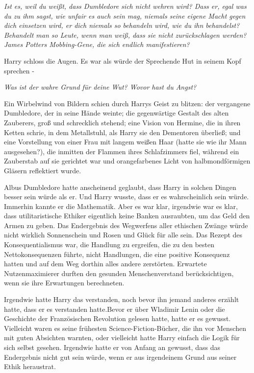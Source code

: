 \emph{Ist es, weil du weißt, dass Dumbledore sich nicht wehren wird? Dass er,
egal was du zu ihm sagst, wie unfair es auch sein mag, niemals seine eigene
Macht gegen dich einsetzen wird, er dich niemals so behandeln wird, wie du ihn
behandelst? Behandelt man so Leute, wenn man weiß, dass sie nicht zurückschlagen
werden? James Potters Mobbing-Gene, die sich endlich manifestieren?}

Harry schloss die Augen. Es war als würde der Sprechende Hut in seinem Kopf
sprechen -

\emph{Was ist der wahre Grund für deine Wut? Wovor hast du Angst?}

Ein Wirbelwind von Bildern schien durch Harrys Geist zu blitzen: der vergangene
Dumbledore, der in seine Hände weinte; die gegenwärtige Gestalt des alten
Zauberers, groß und schrecklich stehend; eine Vision von Hermine, die in ihren
Ketten schrie, in dem Metallstuhl, als Harry sie den Dementoren überließ; und
eine Vorstellung von einer Frau mit langem weißen Haar (hatte sie wie ihr Mann
ausgesehen?), die inmitten der Flammen ihres Schlafzimmers fiel, während ein
Zauberstab auf sie gerichtet war und orangefarbenes Licht von halbmondförmigen
Gläsern reflektiert wurde.

Albus Dumbledore hatte anscheinend geglaubt, dass Harry in solchen Dingen besser
sein würde als er. Und Harry wusste, dass er es wahrscheinlich sein würde.
Immerhin kannte er die Mathematik. Aber es war klar, irgendwie war es klar, dass
utilitaristische Ethiker eigentlich keine Banken ausraubten, um das Geld den
Armen zu geben. Das Endergebnis des Wegwerfens aller ethischen Zwänge würde
nicht wirklich Sonnenschein und Rosen und Glück für alle sein. Das Rezept des
Konsequentialismus war, die Handlung zu ergreifen, die zu den besten
Nettokonsequenzen führte, nicht Handlungen, die eine positive Konsequenz hatten
und auf dem Weg dorthin alles andere zerstörten. Erwartete Nutzenmaximierer
durften den gesunden Menschenverstand berücksichtigen, wenn sie ihre Erwartungen
berechneten.

Irgendwie hatte Harry das verstanden, noch bevor ihn jemand anderes erzählt
hatte, dass er es verstanden hatte.Bevor er über Wladimir Lenin oder die
Geschichte der Französischen Revolution gelesen hatte, hatte er es gewusst.
Vielleicht waren es seine frühesten Science-Fiction-Bücher, die ihn vor Menschen
mit guten Absichten warnten, oder vielleicht hatte Harry einfach die Logik für
sich selbst gesehen. Irgendwie hatte er von Anfang an gewusst, dass das
Endergebnis nicht gut sein würde, wenn er aus irgendeinem Grund aus seiner Ethik
heraustrat.

